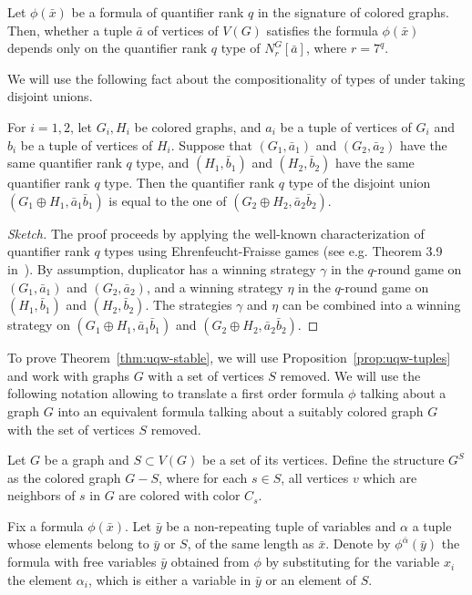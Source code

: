 \begin{lemma}\label{lem:gaifman}
	Let $\phi(\bar x)$ be a  formula 
	of quantifier rank $q$
	in the signature of colored graphs. 	Then, whether a tuple $\bar a$ of vertices of $V(G)$
	satisfies the formula $\phi(\bar x)$
	depends only on the quantifier rank $q$ type of  $N^G_r[\bar a]$,
 where $r=7^q$.
\end{lemma}

We will use the following fact about the compositionality of types of 
under taking disjoint unions.
		\begin{lemma}\label{lem:type-union}
			For $i=1,2$, let $G_i,H_i$ be colored graphs,
			and $a_i$ be a tuple of vertices of $G_i$
			and $b_i$ be a tuple of vertices of $H_i$.
			Suppose that $(G_1,\bar a_1)$ and $(G_2,\bar a_2)$ 
			have the same quantifier rank $q$ type,
			and $(H_1,\bar b_1)$ and $(H_2,\bar b_2)$ 
			have the same quantifier rank $q$ type.			
			Then the quantifier rank $q$ type of the disjoint union 
			$(G_1\oplus H_1,\bar a_1\bar b_1)$ is equal to the one of $(G_2\oplus H_2,\bar a_2\bar b_2)$. \end{lemma}
\begin{proof}[Sketch]
	The proof proceeds by applying the well-known characterization 
	of quantifier rank $q$  types using Ehrenfeucht-Fraisse games (see e.g. Theorem 3.9 in~\cite{libkin}). By assumption, duplicator has a winning strategy $\gamma$ in the $q$-round game on $(G_1,\bar a_1)$ and $(G_2,\bar a_2)$, and a winning strategy $\eta$ in the $q$-round game on $(H_1,\bar b_1)$ and $(H_2,\bar b_2)$. The strategies $\gamma$ and $\eta$ can be combined into a winning strategy on $(G_1\oplus H_1,\bar a_1\bar b_1)$ and $(G_2\oplus H_2,\bar a_2\bar b_2)$.
\end{proof}


\medskip
To prove Theorem~\ref{thm:uqw-stable}, we will use Proposition~\ref{prop:uqw-tuples} and work with graphs $G$
with a set of vertices $S$ removed.
We will use the following notation allowing to translate a first order formula $\phi$ talking about a graph $G$ into an equivalent formula talking about a suitably colored  graph $G$ with the set of vertices $S$ removed.

Let $G$ be a graph and $S\subset V(G)$
be a set of its vertices.
Define the structure $G^{S}$
as the colored graph $G-S$, where for each $s\in S$, all vertices $v$
which are neighbors of $s$ in $G$ are colored with color $C_s$.

Fix a formula $\phi(\bar x)$.
Let $\bar y$ be a non-repeating tuple of variables and $\alpha$ a tuple whose elements belong to $\bar y$ or $S$, of the same length as $\bar x$.
Denote by $\phi^{\bar \alpha}(\bar y)$ the formula with free variables $\bar y$ obtained from $\phi$ by substituting for the variable $x_i$ the element $\alpha_i$, which is either a variable in $\bar y$  or an element of $S$. 


